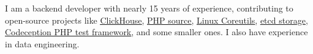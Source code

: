 I am a backend developer with nearly 15 years of experience, contributing to
open-source projects like
\href{https://github.com/ClickHouse/ClickHouse/pulls?q=is\%3Apr+is\%3Aclosed+author\%3AGSokol}{\underline{ClickHouse}},
\href{https://github.com/php/php-src/pulls?q=is\%3Apr+is\%3Aclosed+author\%3AGSokol}{\underline{PHP source}},
\href{https://github.com/coreutils/coreutils/commits?author=GSokol}{\underline{Linux Coreutils}},
\href{https://github.com/etcd-io/etcd/pulls?q=is\%3Apr+is\%3Aclosed+author\%3AGSokol}{\underline{etcd storage}},
\href{https://github.com/Codeception/Codeception/pulls?q=is\%3Apr+is\%3Aclosed+author\%3AGSokol}{\underline{Codeception PHP test framework}},
and some smaller ones. I also have experience in data engineering.
